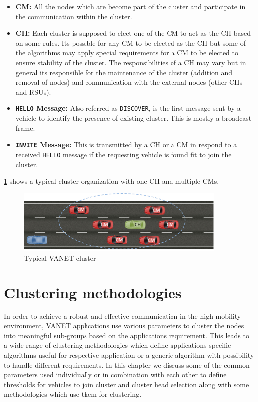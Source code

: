 \documentclass[]{ccs-thesis}
\begin{document}
\begin{itemize}
    \item \textbf{\ac{CM}:} All the nodes which are become part of the cluster and participate in the
          communication within the cluster.
    \item \textbf{\ac{CH}:} Each cluster is supposed to elect one of the \ac{CM} to act as the \ac{CH}
          based on some rules. Its possible for any \ac{CM} to be elected as the \ac{CH} but some of the algorithms
          may apply special requirements for a \ac{CM} to be elected to ensure stability of the cluster. The responsibilities
          of a \ac{CH} may vary but in general its responsible for the maintenance of the cluster
          (addition and removal of nodes) and communication with the external nodes (other \ac{CH}s and \ac{RSU}s).
    \item \textbf{\texttt{HELLO} Message:} Also referred as \texttt{DISCOVER}, is the first message sent by a vehicle to identify
          the presence of existing cluster. This is mostly a broadcast frame.
    \item \textbf{\texttt{INVITE} Message:} This is transmitted by a \ac{CH} or a \ac{CM} in respond to a received \texttt{HELLO} message
          if the requesting vehicle is found fit to join the cluster.
\end{itemize}

\cref{fig:cluster} shows a typical cluster organization with one \ac{CH} and multiple \ac{CM}s.

\begin{figure}[h]%
    \centering
    \includegraphics[width=0.9\textwidth]{figures/cluster}
    \caption{Typical \ac{VANET} cluster }
    \label{fig:cluster}
\end{figure}

\chapter{Clustering methodologies}
\label{sec:methodologies}

In order to achieve a robust and effective communication in the high mobility environment, \ac{VANET} applications use various
parameters to cluster the nodes into meaningful sub-groups based on the applications requirement. This leads to a wide
range of clustering methodologies which define applications specific algorithms useful for respective application or
a generic algorithm with possibility to handle different requirements. In this chapter we discuss some of the common
parameters used individually or in combination with each other to define thresholds for vehicles to join cluster and
cluster head selection along with some methodologies which use them for clustering.
\end{document}
